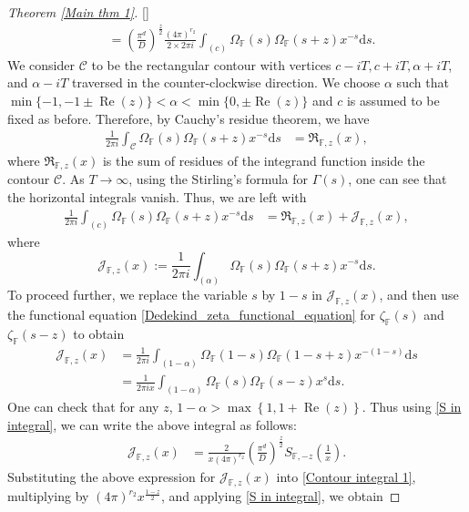 \documentclass[12pt,reqno]{amsart}
\renewcommand{\Re}{\operatorname{Re}}
\renewcommand{\(}{\left\(}
\renewcommand{\)}{\right\)}
\renewcommand{\[}{\left\[}
\renewcommand{\]}{\right\]}
\numberwithin{equation}{section}
\theoremstyle{plain}
\begin{document}
\begin{proof}[Theorem \rm{\ref{Main thm 1}}][]
\begin{align}
&= \left(\frac{\pi^d}{D}\right)^{\frac{z}{2}}\frac{(4\pi)^{r_2}}{2\times 2\pi i}\int_{(c)}\Omega_{\mathbb{F}}(s)\Omega_{\mathbb{F}}(s+z)x^{-s}\textrm{d}s. \label{S in integral}
\end{align}
We consider $\mathcal{C}$ to be the rectangular contour with vertices $c -iT, c+iT, \alpha + iT$, and $\alpha - iT$ traversed in the counter-clockwise direction. We choose $\alpha$ such that $\min\{-1, -1 \pm \Re(z)\} < \alpha < \min\{0, \pm \Re(z)\}$ and $c$ is assumed to be fixed as before. Therefore, by Cauchy's residue theorem, we have
\begin{align*}
\frac{1}{2\pi i}\int_{\mathcal{C}}\Omega_{\mathbb{F}}(s)\Omega_{\mathbb{F}}(s+z)x^{-s}\textrm{d}s &= \mathfrak{R}_{\mathbb{F}, z}(x), 
\end{align*}
where $\mathfrak{R}_{\mathbb{F}, z}(x)$ is the sum of residues of the integrand function inside the contour $\mathcal{C}$. As $T \rightarrow \infty$, using the Stirling's formula for $\Gamma(s)$, one can see that the horizontal integrals vanish. Thus, we are left with
\begin{align}
\frac{1}{2\pi i}\int_{(c)}\Omega_{\mathbb{F}}(s)\Omega_{\mathbb{F}}(s+z)x^{-s}\textrm{d}s &= \mathfrak{R}_{\mathbb{F}, z}(x) + \mathcal{J}_{\mathbb{F}, z}(x), \label{Contour integral 1}
\end{align}
where 
$$
\mathcal{J}_{\mathbb{F}, z}(x) := \frac{1}{2\pi i}\int_{(\alpha)}\Omega_{\mathbb{F}}(s)\Omega_{\mathbb{F}}(s+z)x^{-s}\textrm{d}s.
$$
To proceed further, we replace the variable $s$ by $1-s$ in $\mathcal{J}_{\mathbb{F}, z}(x)$, and then use the functional equation \eqref{Dedekind_zeta_functional_equation} for $\zeta_{\mathbb{F}}(s)$ and $\zeta_{\mathbb{F}}(s-z)$ to obtain
\begin{align*}
\mathcal{J}_{\mathbb{F}, z}(x) &= \frac{1}{2\pi i}\int_{(1-\alpha)}\Omega_{\mathbb{F}}(1-s)\Omega_{\mathbb{F}}(1-s+z)x^{-(1-s)}\textrm{d}s \\
&= \frac{1}{2\pi i x}\int_{(1-\alpha)}\Omega_{\mathbb{F}}(s)\Omega_{\mathbb{F}}(s-z)x^{s}\textrm{d}s.
\end{align*}
One can check that for any $z$, $1-\alpha >\max\left\{1, 1+\Re(z)\right\}$. Thus using \eqref{S in integral}, we can write the above integral as follows:
\begin{align*}
\mathcal{J}_{\mathbb{F}, z}(x) &= \frac{2}{x(4\pi)^{r_2}}\left(\frac{\pi^d}{D}\right)^{\frac{z}{2}}S_{\mathbb{F}, -z}\left(\frac{1}{x}\right).
\end{align*}
Substituting the above expression for $\mathcal{J}_{\mathbb{F},z}(x)$ into \eqref{Contour integral 1}, multiplying by $(4\pi)^{r_2}x^{\frac{1-z}{2}}$, and applying \eqref{S in integral}, we obtain

\end{proof}
\end{document}
